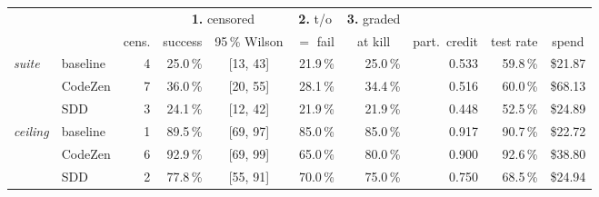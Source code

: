 
\begin{tabular}{@{}llrrcrrrrr@{}}
\toprule
 & & & \multicolumn{2}{c}{\textbf{1.} censored} & \multicolumn{1}{c}{\textbf{2.} t/o} &
 \multicolumn{1}{c}{\textbf{3.} graded} & & & \\
\cmidrule(lr){4-5}\cmidrule(lr){6-6}\cmidrule(lr){7-7}
 & & \multicolumn{1}{c}{cens.} & \multicolumn{1}{c}{success} & \multicolumn{1}{c}{95\,\% Wilson} &
 \multicolumn{1}{c}{$=$ fail} & \multicolumn{1}{c}{at kill} &
 \multicolumn{1}{c}{part.\ credit} &
 \multicolumn{1}{c}{test rate} & \multicolumn{1}{c}{spend} \\
\midrule
\multirow{3}{*}{\emph{suite}} & baseline & 4 & 25.0\,\% & [13, 43] & 21.9\,\% & 25.0\,\% & 0.533 & 59.8\,\% & \$21.87 \\
 & CodeZen & 7 & 36.0\,\% & [20, 55] & 28.1\,\% & 34.4\,\% & 0.516 & 60.0\,\% & \$68.13 \\
 & SDD & 3 & 24.1\,\% & [12, 42] & 21.9\,\% & 21.9\,\% & 0.448 & 52.5\,\% & \$24.89 \\
\midrule
\multirow{3}{*}{\emph{ceiling}} & baseline & 1 & 89.5\,\% & [69, 97] & 85.0\,\% & 85.0\,\% & 0.917 & 90.7\,\% & \$22.72 \\
 & CodeZen & 6 & 92.9\,\% & [69, 99] & 65.0\,\% & 80.0\,\% & 0.900 & 92.6\,\% & \$38.80 \\
 & SDD & 2 & 77.8\,\% & [55, 91] & 70.0\,\% & 75.0\,\% & 0.750 & 68.5\,\% & \$24.94 \\
\bottomrule
\end{tabular}
